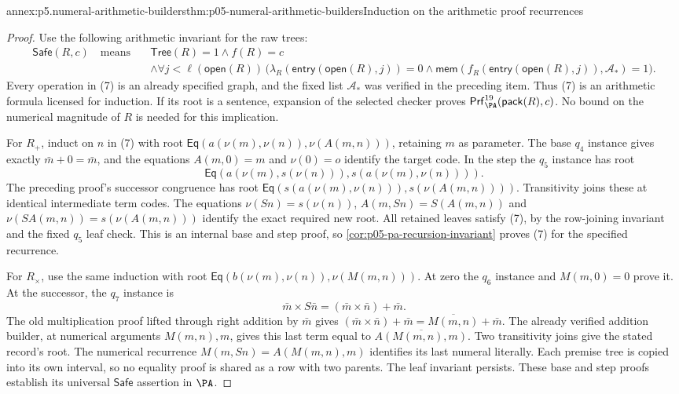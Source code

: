 \begin{annexitem}{annex:p5.numeral-arithmetic-builders}{thm:p05-numeral-arithmetic-builders}{Induction on the arithmetic proof recurrences}
\begin{proof}
Use the following arithmetic invariant for the raw trees:
\[
\begin{split}
 \mathsf{Safe}(R,c)\quad\text{means}\quad&
 \mathsf{Tree}(R)=1\land f(R)=c\\
 &\land\forall j<\ell(\mathsf{open}(R))\,
   \bigl(\lambda_R(\mathsf{entry}(\mathsf{open}(R),j))=0
    \land\mathsf{mem}(f_R(\mathsf{entry}(\mathsf{open}(R),j)),
                                             \mathcal A_*)=1\bigr).
\end{split}
\tag{7}
\]
Every operation in (7) is an already specified graph, and the fixed list
\(\mathcal A_*\) was verified in the preceding item. Thus (7) is an
arithmetic formula licensed for induction. If its root is a sentence,
expansion of the selected checker proves
\(\mathsf{Prf}^{19}_{\PA}(\mathsf{pack}(R),c)\). No bound on the
numerical magnitude of \(R\) is needed for this implication.

For \(R_+\), induct on \(n\) in (7) with root
\(\mathsf{Eq}(a(\nu(m),\nu(n)),\nu(A(m,n)))\), retaining \(m\) as parameter.
The base \(q_4\) instance gives exactly
\(\bar m+0=\bar m\), and the equations \(A(m,0)=m\) and \(\nu(0)=o\)
identify the target code. In the step the \(q_5\) instance has root
\[
 \mathsf{Eq}(a(\nu(m),s(\nu(n))),s(a(\nu(m),\nu(n)))).
\]
The preceding proof's successor congruence has root
\(\mathsf{Eq}(s(a(\nu(m),\nu(n))),s(\nu(A(m,n))))\).
Transitivity joins these at identical intermediate term codes. The equations
\(\nu(Sn)=s(\nu(n))\), \(A(m,Sn)=S(A(m,n))\) and
\(\nu(SA(m,n))=s(\nu(A(m,n)))\) identify the exact required new root.
All retained leaves satisfy (7), by the row-joining invariant and the fixed
\(q_5\) leaf check. This is an internal base and step proof, so
\cref{cor:p05-pa-recursion-invariant} proves (7) for the specified recurrence.

For \(R_\times\), use the same induction with root
\(\mathsf{Eq}(b(\nu(m),\nu(n)),\nu(M(m,n)))\). At zero the \(q_6\) instance
and \(M(m,0)=0\) prove it. At the successor, the \(q_7\) instance is
\[
 \bar m\times S\bar n=(\bar m\times\bar n)+\bar m.
\]
The old multiplication proof lifted through right addition by \(\bar m\)
gives
\((\bar m\times\bar n)+\bar m=\overline{M(m,n)}+\bar m\).
The already verified addition builder, at numerical arguments \(M(m,n),m\),
gives this last term equal to \(\overline{A(M(m,n),m)}\). Two transitivity
joins give the stated record's root. The numerical recurrence
\(M(m,Sn)=A(M(m,n),m)\) identifies its last numeral literally. Each
premise tree is copied into its own interval, so no equality proof is shared
as a row with two parents. The leaf invariant persists. These base and step
proofs establish its universal \(\mathsf{Safe}\) assertion in \(\PA\).


\end{proof}
\end{annexitem}
